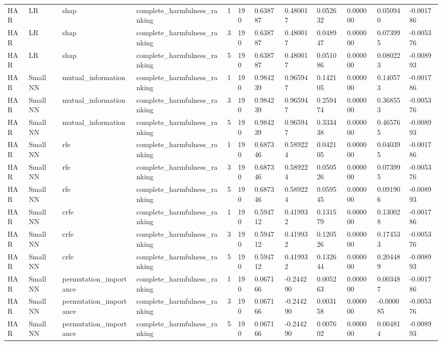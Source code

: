 \begin{table}[t]
\begin{tabular}{llllllllllll}
HAR & LR & shap & complete\_harmfulness\_ranking & 1 & 190 & 0.638787 & 0.480017 & 0.052632 & 0.000000 & 0.050940 & -0.001786 \\
HAR & LR & shap & complete\_harmfulness\_ranking & 3 & 190 & 0.638787 & 0.480017 & 0.048947 & 0.000000 & 0.073995 & -0.005376 \\
HAR & LR & shap & complete\_harmfulness\_ranking & 5 & 190 & 0.638787 & 0.480017 & 0.051086 & 0.000000 & 0.080223 & -0.008993 \\
HAR & Small NN & mutual\_information & complete\_harmfulness\_ranking & 1 & 190 & 0.984239 & 0.965947 & 0.142105 & 0.000000 & 0.140573 & -0.001786 \\
HAR & Small NN & mutual\_information & complete\_harmfulness\_ranking & 3 & 190 & 0.984239 & 0.965947 & 0.259474 & 0.000000 & 0.368553 & -0.005376 \\
HAR & Small NN & mutual\_information & complete\_harmfulness\_ranking & 5 & 190 & 0.984239 & 0.965947 & 0.333438 & 0.000000 & 0.465765 & -0.008993 \\
HAR & Small NN & rfe & complete\_harmfulness\_ranking & 1 & 190 & 0.687346 & 0.589224 & 0.042105 & 0.000000 & 0.040395 & -0.001786 \\
HAR & Small NN & rfe & complete\_harmfulness\_ranking & 3 & 190 & 0.687346 & 0.589224 & 0.050526 & 0.000000 & 0.073995 & -0.005376 \\
HAR & Small NN & rfe & complete\_harmfulness\_ranking & 5 & 190 & 0.687346 & 0.589224 & 0.059545 & 0.000000 & 0.091906 & -0.008993 \\
HAR & Small NN & crfe & complete\_harmfulness\_ranking & 1 & 190 & 0.594712 & 0.419932 & 0.131579 & 0.000000 & 0.130028 & -0.001786 \\
HAR & Small NN & crfe & complete\_harmfulness\_ranking & 3 & 190 & 0.594712 & 0.419932 & 0.120526 & 0.000000 & 0.174533 & -0.005376 \\
HAR & Small NN & crfe & complete\_harmfulness\_ranking & 5 & 190 & 0.594712 & 0.419932 & 0.132644 & 0.000000 & 0.204489 & -0.008993 \\
HAR & Small NN & permutation\_importance & complete\_harmfulness\_ranking & 1 & 190 & 0.067166 & -0.244290 & 0.005263 & 0.000000 & 0.003487 & -0.001786 \\
HAR & Small NN & permutation\_importance & complete\_harmfulness\_ranking & 3 & 190 & 0.067166 & -0.244290 & 0.003158 & 0.000000 & -0.000085 & -0.005376 \\
HAR & Small NN & permutation\_importance & complete\_harmfulness\_ranking & 5 & 190 & 0.067166 & -0.244290 & 0.007602 & 0.000000 & 0.004814 & -0.008993 \\

\end{tabular}
\end{table}

